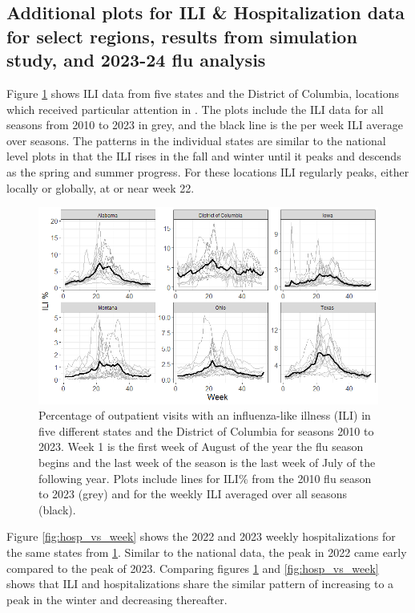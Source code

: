 \documentclass[ba]{imsart}
\theoremstyle{plain}
\theoremstyle{definition}
\theoremstyle{remark}
\begin{document}
\begin{supplement}


\section{Additional plots for ILI \& Hospitalization data for select regions,
         results from simulation study, and 2023-24 flu analysis}

Figure \ref{fig:ili_vs_week} shows ILI data from five states and the District of Columbia, locations which received particular attention in \cite{osthus2021multiscale}. The plots include the ILI data for all seasons from 2010 to 2023 in grey, and the black line is the per week ILI average over seasons. The patterns in the individual states are similar to the national level plots in that the ILI rises in the fall and winter until it peaks and descends as the spring and summer progress. For these locations ILI regularly peaks, either locally or globally, at or near week 22. 

 \begin{figure}[hbt!]
    \centering
    \includegraphics[scale=.7]{Images/ili_vs_week.png}
    \caption{Percentage of outpatient visits with an influenza-like illness (ILI) in five different states and the District of Columbia for seasons 2010 to 2023. Week 1 is the first week of August of the year the flu season begins and the last week of the season is the last week of July of the following year.
     Plots include lines for ILI\% from the 2010 flu season to 2023 (grey) and for the weekly ILI averaged over all seasons (black).}
    \label{fig:ili_vs_week}
\end{figure}


Figure \ref{fig:hosp_vs_week} shows the 2022 and 2023 weekly hospitalizations for the same states from \ref{fig:ili_vs_week}. Similar to the national data, the peak in 2022 came early compared to the peak of 2023. Comparing figures \ref{fig:ili_vs_week} and \ref{fig:hosp_vs_week} shows that ILI and hospitalizations share the similar pattern of increasing to a peak in the winter and decreasing thereafter. 


\end{supplement}
\end{document}

